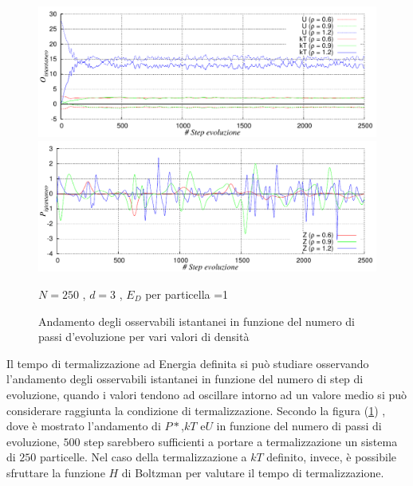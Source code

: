 	\begin{figure}[htbp]
		\centering
		\caption[Sfere Soffici$/$Preliminari\_Termalizzazione.cpp]{Andamento degli osservabili istantanei in funzione del numero di passi d'evoluzione per vari valori di densità}\label{fig: Termal E D Soffici}\vspace{-15pt}

		\includegraphics[scale=0.95]{Immagini/Soffici/Termal_OvsStep}

		\includegraphics[scale=0.95]{Immagini/Soffici/Termal_PvsStep}

		\centering  \footnotesize{$N= 250$ , $d=3$ , $E_D$ per particella =1}
	\end{figure}
	
Il tempo di termalizzazione ad Energia definita si può studiare osservando l'andamento degli osservabili istantanei in funzione del numero di step di evoluzione, quando i valori tendono ad oscillare intorno ad un valore medio si può considerare raggiunta la condizione di termalizzazione. 
Secondo la figura (\ref{fig: Termal E D Soffici}) , dove è mostrato l'andamento di $P*$,$kT$ e$U$ in funzione del numero di passi di evoluzione, $500$ step sarebbero sufficienti a portare a termalizzazione un sistema di $250$ particelle.
\medskip\newline
Nel caso della termalizzazione a $kT$ definito, invece, è possibile sfruttare la funzione $H$ di Boltzman per valutare il tempo di termalizzazione.

